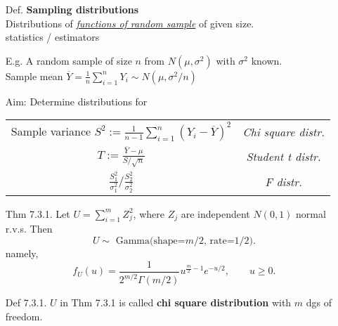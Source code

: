\begin{frame}
\begin{enumerate}
	\item[Def.] \textcolor{yellow!80!black}{\bf Sampling distributions}\\[1em]
		Distributions of \underline{\it functions of random sample} of given size.  \\
		\hspace{8.5em}  statistics / estimators
		\vfill
	\item[E.g.] A random sample of size $n$ from $N(\mu,\sigma^2)$ with $\sigma^2$ known.\\[1em]
		Sample mean $\overline{Y} = \frac{1}{n}\sum_{i=1}^n Y_i\sim N(\mu,\sigma^2/n)$
		\vfill
	\item[Aim:] Determine distributions for \\[2em]
		\begin{center}
			\begin{tabular}{c|c}
				Sample variance $S^2:=\frac{1}{n-1}\sum_{i=1}^n\left(Y_i-\overline{Y}\right)^2$ & {\it Chi square distr.}\\[1em]
				$\displaystyle T:=\frac{\overline{Y}-\mu}{S/\sqrt{n}}$ & {\it Student t distr.}\\[1em]
				$\displaystyle \frac{S_1^2}{\sigma_1^2}\bigg/\frac{S_2^2}{\sigma_2^2}$ & {\it F distr.}
			\end{tabular}
		\end{center}
\end{enumerate}
\end{frame}
\begin{frame}
\begin{enumerate}
	\item[Thm \small 7.3.1.] Let $U=\sum_{i=1}^m Z_j^2$, where $Z_j$ are independent
		$N(0,1)$ normal r.v.s. Then
		\[
			\text{$U\sim$ Gamma(shape=$m/2$, rate=$1/2$).}
		\]
		namely,
		\[
			f_U(u) =  \frac{1}{2^{m/2}\Gamma(m/2)}u^{ \frac{m}{2}-1}e^{-u/2}, \qquad u\ge 0.
		\]
		\vfill
	\item[Def \small 7.3.1.] $U$ in Thm 7.3.1 is called \textcolor{yellow!80!black}{\bf chi square distribution} with $m$ dgs of freedom.
\end{enumerate}
\end{frame}
